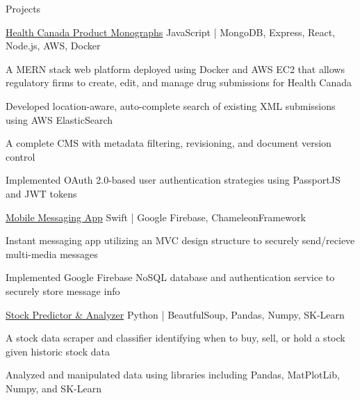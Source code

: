 \documentclass{resume} %
\begin{document}
\vspace{-0.5em}

\begin{rSection}{Projects}

    \begin{rProjectSection}
      { \href{http://3.14.28.3/login}{Health Canada Product Monographs} }
      {}
      {JavaScript \textnormal{|} MongoDB, Express, React, Node.js, AWS, Docker}
      {}
      {
        \item A MERN stack web platform deployed using Docker and AWS EC2 that allows regulatory firms to create, edit, and manage drug submissions for Health Canada 
        \item Developed location-aware, auto-complete search of existing XML submissions using AWS ElasticSearch 
        \item A complete CMS with metadata filtering, revisioning, and document version control
        \item Implemented OAuth 2.0-based user authentication strategies using PassportJS and JWT tokens
      }
    \end{rProjectSection}


    \begin{rProjectSection}
      { {\href{https://github.com/tharseken/Mobile-Messaging-Application}{Mobile Messaging App}} }
      {}
      {Swift \textnormal{|} Google Firebase, ChameleonFramework}
      {}
      {
        \item Instant messaging app utilizing an MVC design structure to securely send/recieve multi-media messages
        \item Implemented Google Firebase NoSQL database and authentication service to securely store message info
      }
    \end{rProjectSection}

    \begin{rProjectSection}
      {{\href{https://github.com/tharseken/Stock-Predictor-and-Analyzer}{Stock Predictor \& Analyzer}}}
      {} 
      {Python \textnormal{|} BeautfulSoup, Pandas, Numpy, SK-Learn} 
      {}
      {
        \item A stock data scraper and classifier identifying when to buy, sell, or hold a stock given historic stock data
        \item Analyzed and manipulated data using libraries including Pandas, MatPlotLib, Numpy, and SK-Learn
      }
    \end{rProjectSection}


\end{rSection}
\end{document}
